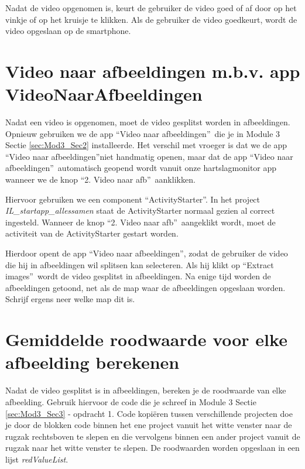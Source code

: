Nadat de video opgenomen is, keurt de gebruiker de video goed of af door op het vinkje of op het kruisje te klikken. Als de gebruiker de video goedkeurt, wordt de video opgeslaan op de smartphone.

\section{Video naar afbeeldingen m.b.v. app VideoNaarAfbeeldingen}
\label{sec:Mod5_Sec2}
%
Nadat een video is opgenomen, moet de video gesplitst worden in afbeeldingen. Opnieuw gebruiken we de app \textquotedblleft Video naar afbeeldingen\textquotedblright \ die je in Module 3 Sectie \ref{sec:Mod3_Sec2} installeerde. Het verschil met vroeger is dat we de app \textquotedblleft Video naar afbeeldingen\textquotedblright niet handmatig openen, maar dat de app \textquotedblleft Video naar afbeeldingen\textquotedblright \ automatisch geopend wordt vanuit onze hartslagmonitor app wanneer we de knop \textquotedblleft 2. Video naar afb\textquotedblright \ aanklikken.

Hiervoor gebruiken we een component \textquotedblleft ActivityStarter\textquotedblright. In het project \emph{IL\_startapp\_allessamen} staat de ActivityStarter normaal gezien al correct ingesteld. Wanneer de knop \textquotedblleft 2. Video naar afb\textquotedblright\  aangeklikt wordt, moet de activiteit van de ActivityStarter gestart worden. 

Hierdoor opent de app \textquotedblleft Video naar afbeeldingen\textquotedblright, zodat de gebruiker de video die hij in afbeeldingen wil splitsen kan selecteren. Als hij klikt op \textquotedblleft Extract images\textquotedblright \ wordt de video gesplitst in afbeeldingen. Na enige tijd worden de afbeeldingen getoond, net als de map waar de afbeeldingen opgeslaan worden. Schrijf ergens neer welke map dit is.

\section{Gemiddelde roodwaarde voor elke afbeelding berekenen}
\label{sec:Mod5_Sec3}
%
Nadat de video gesplitst is in afbeeldingen, bereken je de roodwaarde van elke afbeelding. Gebruik hiervoor de code die je schreef in Module 3 Sectie \ref{sec:Mod3_Sec3} - opdracht 1. Code kopi\"eren tussen verschillende projecten doe je door de blokken code binnen het ene project vanuit het witte venster naar de rugzak rechtsboven te slepen en die vervolgens binnen een ander project vanuit de rugzak naar het witte venster te slepen. De roodwaarden worden opgeslaan in een lijst \emph{redValueList}. 

